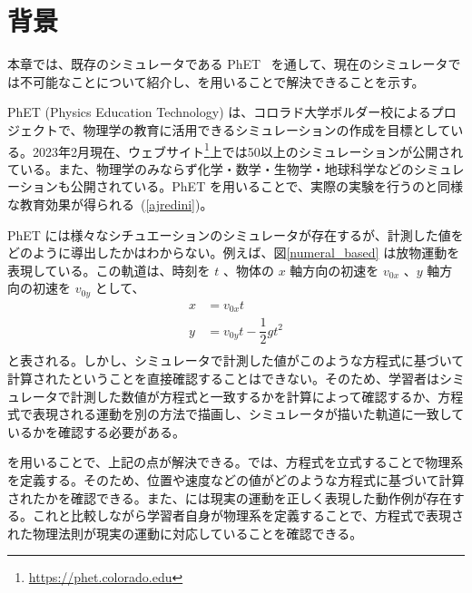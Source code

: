 \chapter{背景} \label{background}

本章では、既存のシミュレータである PhET~\cite{perkins_phet_2006} を通して、現在のシミュレータでは不可能なことについて紹介し、\simname を用いることで解決できることを示す。

PhET (Physics Education Technology) は、コロラド大学ボルダー校によるプロジェクトで、物理学の教育に活用できるシミュレーションの作成を目標としている。2023年2月現在、ウェブサイト\footnote{\url{https://phet.colorado.edu}}上では50以上のシミュレーションが公開されている。また、物理学のみならず化学・数学・生物学・地球科学などのシミュレーションも公開されている。PhET を用いることで、実際の実験を行うのと同様な教育効果が得られる~\cite{ajredini_real_2014}(\ref{ajredini})。

PhET には様々なシチュエーションのシミュレータが存在するが、計測した値をどのように導出したかはわからない。例えば、図\ref{numeral_based} は放物運動を表現している。この軌道は、時刻を $t$ 、物体の $x$ 軸方向の初速を $v_{0x}$ 、$y$ 軸方向の初速を $v_{0y}$ として、
\begin{align*}
  x &= v_{0x} t \\
  y &= v_{0y} t - \dfrac{1}{2}gt^2 \\
\end{align*}
と表される。しかし、シミュレータで計測した値がこのような方程式に基づいて計算されたということを直接確認することはできない。そのため、学習者はシミュレータで計測した数値が方程式と一致するかを計算によって確認するか、方程式で表現される運動を別の方法で描画し、シミュレータが描いた軌道に一致しているかを確認する必要がある。

\simname を用いることで、上記の点が解決できる。\simname では、方程式を立式することで物理系を定義する。そのため、位置や速度などの値がどのような方程式に基づいて計算されたかを確認できる。また、\simname には現実の運動を正しく表現した動作例が存在する。これと比較しながら学習者自身が物理系を定義することで、方程式で表現された物理法則が現実の運動に対応していることを確認できる。
